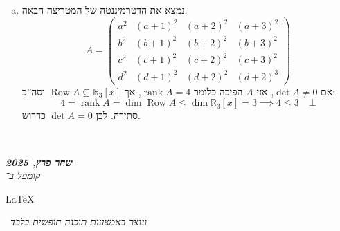 \documentclass[]{article}
\newcommand\en[1] {\begin{otherlanguage}{english}#1\end{otherlanguage}}
\newcommand\ndoc  {\dotfill \\ \vfil {\begin{center}
            {\textbf{\textit{שחר פרץ, 2025}} \\
                \scriptsize \textit{קומפל ב־}\en{\LaTeX}\,\textit{ ונוצר באמצעות תוכנה חופשית בלבד}}
    \end{center}} \vfil	}
\newcommand\R     {\mathbb{R}}
\DeclareMathOperator{\row}    {Row}
\DeclareMathOperator{\rk}     {rank}
\newcommand\pms[1]    {\begin{pmatrix}
        #1
\end{pmatrix}}
\theoremstyle{definition}
\begin{document}
\begin{enumerate}[(a)]
        \item נמצא את הדטרמיננטה של המטריצה הבאה: 
        \[ A = \pms{a^2 & (a + 1)^{2} & (a + 2)^{2} & (a + 3)^{2} \\ b^2 & (b + 1)^{2} & (b + 2)^{2} & (b + 3)^{2} \\ c^2 & (c + 1)^{2} & (c + 2)^{2} & (c + 3)^{2} \\ d^2 & (d + 1)^{2} & (d + 2)^{2} & (d + 2)^{3}} \]
        אם $\det A \neq 0$, אזי $A$ הפיכה כלומר $\rk A = 4$, אך $\row A \subseteq \R_3[x]$ וסה''כ: 
        \[ 4 = \rk A = \dim \row A \le \dim \R_3[x] = 3 \implies 4 \le 3 \quad \bot \]
        סתירה. לכן $\det A = 0$ כדרוש. 
        
    \end{enumerate}
    
    
    
    \ndoc
\end{document}
